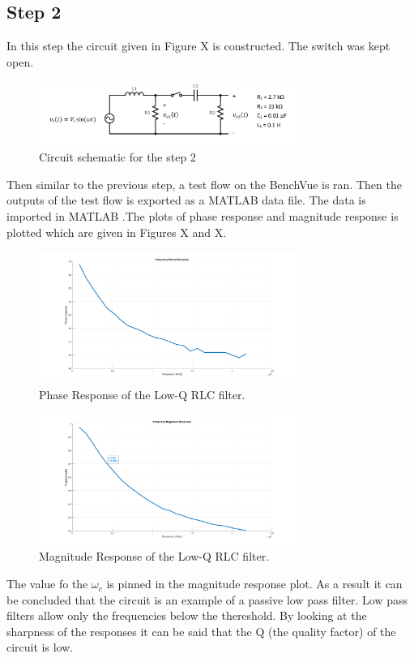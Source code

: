 \documentclass[letterpaper,12pt]{article}
\begin{document}
\subsection{Step 2}
In this step the circuit given in Figure X is constructed. The switch was kept open. 
\begin{figure}[H]
    \centering
    \includegraphics[width = 0.75\textwidth]{lowqlowpass.png}
    \caption{Circuit schematic for the step 2}
\end{figure} 
Then similar to the previous step, a test flow on the BenchVue is ran. Then the outputs of the test flow is exported as a MATLAB data file. The data is imported in MATLAB .The plots of phase response and magnitude response is plotted which are given in Figures X and X.
\begin{figure}[H]
    \centering
    \includegraphics[width = 0.75\textwidth]{2_1_2.png}
    \caption{Phase Response of the Low-Q RLC filter.}
\end{figure} 

\begin{figure}[H]
    \centering
    \includegraphics[width = 0.75\textwidth]{2_1_1.png}
    \caption{Magnitude Response of the Low-Q RLC filter.}
\end{figure} 
The value fo the \(\omega_c\) is pinned in the magnitude response plot. As a result it can be concluded that the circuit is an example of a passive low pass filter. Low pass filters allow only the frequencies below the thereshold.  By looking at the sharpness of the responses it can be said that the Q (the quality factor) of the circuit is low. 
    
\end{document}
